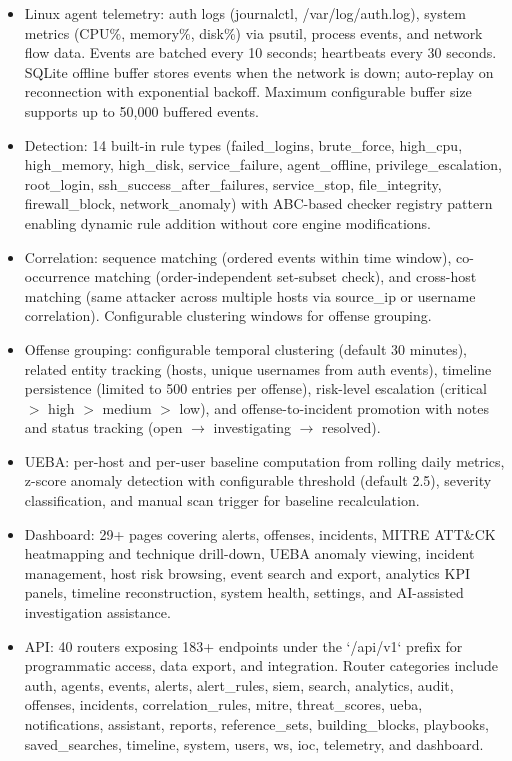 \begin{itemize}
    \item Linux agent telemetry: auth logs (journalctl, /var/log/auth.log), system metrics (CPU\%, memory\%, disk\%) via psutil, process events, and network flow data. Events are batched every 10 seconds; heartbeats every 30 seconds. SQLite offline buffer stores events when the network is down; auto-replay on reconnection with exponential backoff. Maximum configurable buffer size supports up to 50,000 buffered events.
    \item Detection: 14 built-in rule types (failed\_logins, brute\_force, high\_cpu, high\_memory, high\_disk, service\_failure, agent\_offline, privilege\_escalation, root\_login, ssh\_success\_after\_failures, service\_stop, file\_integrity, firewall\_block, network\_anomaly) with ABC-based checker registry pattern enabling dynamic rule addition without core engine modifications.
    \item Correlation: sequence matching (ordered events within time window), co-occurrence matching (order-independent set-subset check), and cross-host matching (same attacker across multiple hosts via source\_ip or username correlation). Configurable clustering windows for offense grouping.
    \item Offense grouping: configurable temporal clustering (default 30 minutes), related entity tracking (hosts, unique usernames from auth events), timeline persistence (limited to 500 entries per offense), risk-level escalation (critical $>$ high $>$ medium $>$ low), and offense-to-incident promotion with notes and status tracking (open $\rightarrow$ investigating $\rightarrow$ resolved).
    \item UEBA: per-host and per-user baseline computation from rolling daily metrics, z-score anomaly detection with configurable threshold (default 2.5), severity classification, and manual scan trigger for baseline recalculation.
    \item Dashboard: 29+ pages covering alerts, offenses, incidents, MITRE ATT\&CK heatmapping and technique drill-down, UEBA anomaly viewing, incident management, host risk browsing, event search and export, analytics KPI panels, timeline reconstruction, system health, settings, and AI-assisted investigation assistance.
    \item API: 40 routers exposing 183+ endpoints under the `/api/v1` prefix for programmatic access, data export, and integration. Router categories include auth, agents, events, alerts, alert\_rules, siem, search, analytics, audit, offenses, incidents, correlation\_rules, mitre, threat\_scores, ueba, notifications, assistant, reports, reference\_sets, building\_blocks, playbooks, saved\_searches, timeline, system, users, ws, ioc, telemetry, and dashboard.
\end{itemize}

